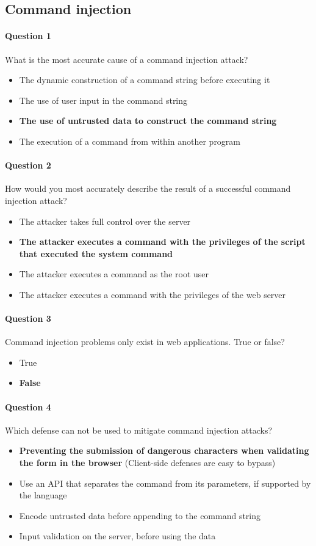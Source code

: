 \documentclass[titlepage]{article}
\begin{document}
    \subsection{Command injection}
    \paragraph{Question 1} What is the most accurate cause of a command injection attack?
    \begin{itemize}
        \item The dynamic construction of a command string before executing it
        \item The use of user input in the command string
        \item \textbf{The use of untrusted data to construct the command string} \checkmark
        \item The execution of a command from within another program
    \end{itemize}
    \paragraph{Question 2} How would you most accurately describe the result of a successful command injection attack?
    \begin{itemize}
        \item The attacker takes full control over the server
        \item \textbf{The attacker executes a command with the privileges of the script that executed the system command} \checkmark
        \item The attacker executes a command as the root user
        \item The attacker executes a command with the privileges of the web server
    \end{itemize}
    \paragraph{Question 3} Command injection problems only exist in web applications. True or false?
    \begin{itemize}
        \item True
        \item \textbf{False} \checkmark
    \end{itemize}
    \paragraph{Question 4} Which defense can not be used to mitigate command injection attacks?
    \begin{itemize}
        \item \textbf{Preventing the submission of dangerous characters when validating the form in the browser} \checkmark (Client-side defenses are easy to bypass)
        \item Use an API that separates the command from its parameters, if supported by the language
        \item Encode untrusted data before appending to the command string
        \item Input validation on the server, before using the data
    \end{itemize}
\end{document}
